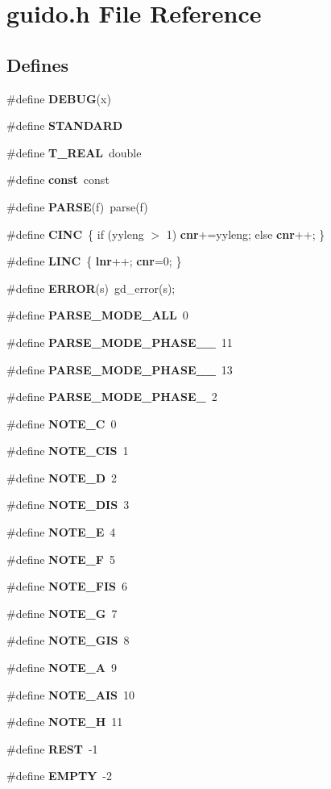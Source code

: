 \section{guido.h File Reference}
\label{guido_8h}
\subsection*{Defines}
\begin{CompactItemize}
\item 
\#define {\bf DEBUG}(x)
\item 
\#define {\bf STANDARD}
\item 
\#define {\bf T\_\-REAL}\ double
\item 
\#define {\bf const}\ const
\item 
\#define {\bf PARSE}(f)\ parse(f)
\item 
\#define {\bf CINC}\ \{ if (yyleng $>$ 1) {\bf cnr}+=yyleng; else {\bf cnr}++; \}
\item 
\#define {\bf LINC}\ \{ {\bf lnr}++; {\bf cnr}=0; \}
\item 
\#define {\bf ERROR}(s)\ gd\_\-error(s);
\item 
\#define {\bf PARSE\_\-MODE\_\-ALL}\ 0
\item 
\#define {\bf PARSE\_\-MODE\_\-PHASE\_\_}\ 11
\item 
\#define {\bf PARSE\_\-MODE\_\-PHASE\_\_}\ 13
\item 
\#define {\bf PARSE\_\-MODE\_\-PHASE\_}\ 2
\item 
\#define {\bf NOTE\_\-C}\ 0
\item 
\#define {\bf NOTE\_\-CIS}\ 1
\item 
\#define {\bf NOTE\_\-D}\ 2
\item 
\#define {\bf NOTE\_\-DIS}\ 3
\item 
\#define {\bf NOTE\_\-E}\ 4
\item 
\#define {\bf NOTE\_\-F}\ 5
\item 
\#define {\bf NOTE\_\-FIS}\ 6
\item 
\#define {\bf NOTE\_\-G}\ 7
\item 
\#define {\bf NOTE\_\-GIS}\ 8
\item 
\#define {\bf NOTE\_\-A}\ 9
\item 
\#define {\bf NOTE\_\-AIS}\ 10
\item 
\#define {\bf NOTE\_\-H}\ 11
\item 
\#define {\bf REST}\ -1
\item 
\#define {\bf EMPTY}\ -2

\end{CompactItemize}
